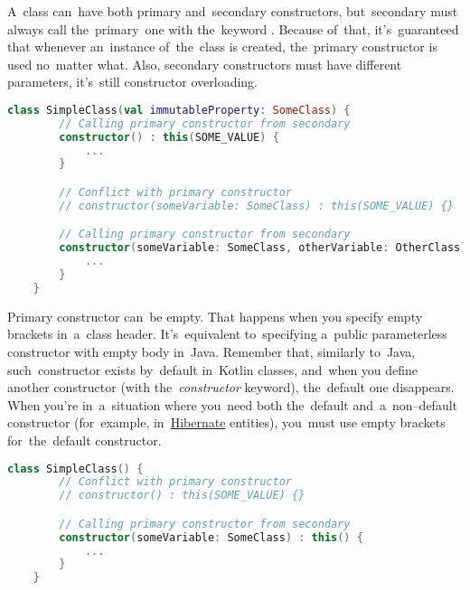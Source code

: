 \noindent A~class can~have both primary and~secondary constructors, but~secondary must always call the~primary~one with the~keyword .
Because of~that, it's~guaranteed that whenever an~instance of~the~class is created, the~primary constructor is used no~matter what.
Also, secondary constructors must have different parameters, it's~still constructor \mbox{overloading.}

\begin{lstlisting}[language=Kotlin]
    class SimpleClass(val immutableProperty: SomeClass) {
        // Calling primary constructor from secondary
        constructor() : this(SOME_VALUE) {
            ...
        }

        // Conflict with primary constructor
        // constructor(someVariable: SomeClass) : this(SOME_VALUE) {}

        // Calling primary constructor from secondary
        constructor(someVariable: SomeClass, otherVariable: OtherClass) : this(SOME_VALUE) {
            ...
        }
    }
\end{lstlisting}
\newline

\emten
\noindent Primary constructor can~be empty.
That happens when you specify empty brackets in~a~class header.
It's~equivalent to~specifying a~public parameterless constructor with empty body in~Java.
Remember that, similarly to~Java, such~constructor exists by~default in~Kotlin classes, and~when you define another constructor (with the~\textit{constructor} keyword), the~default one disappears.
When you're in~a~situation where you~need both the~default and~a~non--default constructor (for~example, in~\hyperref[hibernate]{Hibernate} entities), you~must use empty brackets for~the~default constructor.
\newpage

\begin{lstlisting}[language=Kotlin]
    class SimpleClass() {
        // Conflict with primary constructor
        // constructor() : this(SOME_VALUE) {}

        // Calling primary constructor from secondary
        constructor(someVariable: SomeClass) : this() {
            ...
        }
    }
\end{lstlisting}

